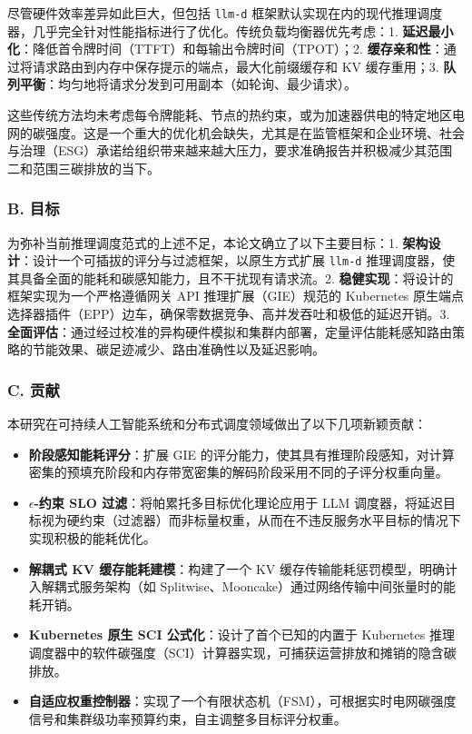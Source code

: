 尽管硬件效率差异如此巨大，但包括 \texttt{llm-d} 框架默认实现在内的现代推理调度器，几乎完全针对性能指标进行了优化。传统负载均衡器优先考虑：1. \textbf{延迟最小化}：降低首令牌时间（TTFT）和每输出令牌时间（TPOT）；2. \textbf{缓存亲和性}：通过将请求路由到内存中保存提示的端点，最大化前缀缓存和 KV 缓存重用；3. \textbf{队列平衡}：均匀地将请求分发到可用副本（如轮询、最少请求）。

这些传统方法均未考虑每令牌能耗、节点的热约束，或为加速器供电的特定地区电网的碳强度。这是一个重大的优化机会缺失，尤其是在监管框架和企业环境、社会与治理（ESG）承诺给组织带来越来越大压力，要求准确报告并积极减少其范围二和范围三碳排放的当下。

\subsubsection{B. 目标}\label{b.-objectives}

为弥补当前推理调度范式的上述不足，本论文确立了以下主要目标：1. \textbf{架构设计}：设计一个可插拔的评分与过滤框架，以原生方式扩展 \texttt{llm-d} 推理调度器，使其具备全面的能耗和碳感知能力，且不干扰现有请求流。2. \textbf{稳健实现}：将设计的框架实现为一个严格遵循网关 API 推理扩展（GIE）规范的 Kubernetes 原生端点选择器插件（EPP）边车，确保零数据竞争、高并发吞吐和极低的延迟开销。3. \textbf{全面评估}：通过经过校准的异构硬件模拟和集群内部署，定量评估能耗感知路由策略的节能效果、碳足迹减少、路由准确性以及延迟影响。

\subsubsection{C. 贡献}\label{c.-contributions}

本研究在可持续人工智能系统和分布式调度领域做出了以下几项新颖贡献：
\begin{itemize}
    \item \textbf{阶段感知能耗评分}：扩展 GIE 的评分能力，使其具有推理阶段感知，对计算密集的预填充阶段和内存带宽密集的解码阶段采用不同的子评分权重向量。
    \item \textbf{\texorpdfstring{\(\epsilon\)}{ε}-约束 SLO 过滤}：将帕累托多目标优化理论应用于 LLM 调度器，将延迟目标视为硬约束（过滤器）而非标量权重，从而在不违反服务水平目标的情况下实现积极的能耗优化。
    \item \textbf{解耦式 KV 缓存能耗建模}：构建了一个 KV 缓存传输能耗惩罚模型，明确计入解耦式服务架构（如 Splitwise、Mooncake）通过网络传输中间张量时的能耗开销。
    \item \textbf{Kubernetes 原生 SCI 公式化}：设计了首个已知的内置于 Kubernetes 推理调度器中的软件碳强度（SCI）计算器实现，可捕获运营排放和摊销的隐含碳排放。
    \item \textbf{自适应权重控制器}：实现了一个有限状态机（FSM），可根据实时电网碳强度信号和集群级功率预算约束，自主调整多目标评分权重。
\end{itemize}


